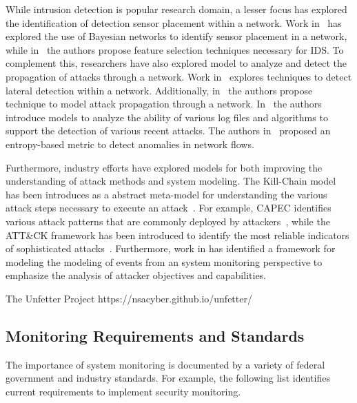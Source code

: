 \documentclass[journal]{IEEEtran}
\begin{document}
While intrusion detection is popular research domain, a lesser focus has explored the identification of detection sensor placement within a network. Work in~\cite{Modelo-Howard2008}  has explored the use of Bayesian networks to identify sensor placement in a network, while in~\cite{6196965} the authors propose feature selection techniques necessary for IDS. \color{red} \cite{DBLP:journals/corr/MadboulyGB14} \color{black}  To complement this, researchers have also explored model to analyze and detect the propagation of attacks through a network. Work in~\cite{7794326} explores techniques to detect lateral detection within a network. Additionally, in~\cite{6847231} the authors propose technique to model attack propagation through a network. In~\cite{Pei:2016:HAS:2991079.2991122} the authors introduce models to analyze the ability of various log files and algorithms to support the detection of various recent attacks. The authors in~\cite{mining} proposed an entropy-based metric to detect anomalies in network flows. 

Furthermore, industry efforts have explored models for both improving the understanding of attack methods and system modeling. The Kill-Chain model has been introduces as a abstract meta-model for understanding the various attack steps necessary to execute an attack~\cite{kill-chain}.  For example, CAPEC identifies various attack patterns that are commonly deployed by attackers~\cite{mitre:capec}, while the ATT\&CK framework has been introduced to identify the most reliable indicators of sophisticated attacks~\cite{mitre:attack}. Furthermore, work in \cite{diamondmodel} has identified a framework for modeling the modeling of events from an system monitoring perspective to emphasize the analysis of attacker objectives and capabilities.


The Unfetter Project
https://nsacyber.github.io/unfetter/

\subsection{Monitoring Requirements and  Standards}
The importance of system monitoring is documented by a variety of federal government and industry standards. For example, the following list identifies current requirements to implement security monitoring. 
\end{document}
